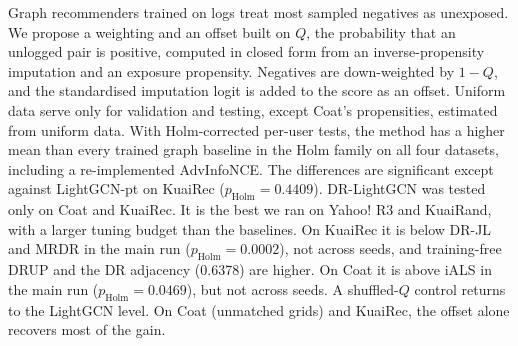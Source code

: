 Graph recommenders trained on logs treat most sampled negatives as unexposed. We propose a weighting and an offset built on $Q$, the probability that an unlogged pair is positive, computed in closed form from an inverse-propensity imputation and an exposure propensity. Negatives are down-weighted by $1-Q$, and the standardised imputation logit is added to the score as an offset. Uniform data serve only for validation and testing, except Coat's propensities, estimated from uniform data. With Holm-corrected per-user tests, the method has a higher mean than every trained graph baseline in the Holm family on all four datasets, including a re-implemented AdvInfoNCE. The differences are significant except against LightGCN-pt on KuaiRec ($p_{\text{Holm}}=0.4409$). DR-LightGCN was tested only on Coat and KuaiRec. It is the best we ran on Yahoo! R3 and KuaiRand, with a larger tuning budget than the baselines. On KuaiRec it is below DR-JL and MRDR in the main run ($p_{\text{Holm}}=0.0002$), not across seeds, and training-free DRUP and the DR adjacency (0.6378) are higher. On Coat it is above iALS in the main run ($p_{\text{Holm}}=0.0469$), but not across seeds. A shuffled-$Q$ control returns to the LightGCN level. On Coat (unmatched grids) and KuaiRec, the offset alone recovers most of the gain.

